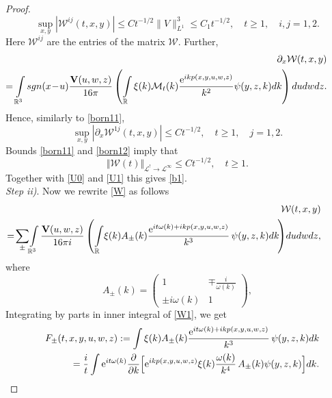 \documentclass[10pt,a4paper]{amsart}
\newcommand{\E}{\mathrm{e}}
\newcommand{\R}{{\mathbb R}}
\newcommand{\cL}{{\mathcal L}}
\newcommand{\ds}{\displaystyle}
\begin{document}
\begin{proof}
\begin{equation}\label{born11}
\sup\limits_{x,y}|{\mathcal W}^{ij}(t,x,y)|\le C t^{-1/2}\|V\|_{L^1}^3\le C_1t^{-1/2},\quad t\ge 1,\quad i,j=1,2.
\end{equation}
Here ${\mathcal W}^{ij}$ are the entries of the matrix ${\mathcal W}$. Further,
\begin{eqnarray}\nonumber
\!\!\!\!\!\!\!\!\!\!\!\! &&\!\!\!\!\!\!\!\!\partial_x{\mathcal W}(t,x,y)\\
\nonumber
\!\!\!\!\!\!\!\!\!\!\!\!&&\!\!\!\!\!\!\!\!=\int\limits_{\R^3} {\rm sgn} (x\!-\!u)\frac{{\mathbf V}(u,\rm w,z)}{16 \pi}\left(\int\limits_{\R} \xi(k)
{\mathcal M}_t(k)
\frac{\E^{ikp(x,y,u,\rm w,z)}}{k^2}\psi(y,z,k)dk\right) dud{\rm w} dz.
\end{eqnarray}
Hence, similarly to \eqref{born11},
\begin{equation}\label{born12}
\sup\limits_{x,y}|\partial_x{\mathcal W}^{1j}(t,x,y)|\le C t^{-1/2},\quad t\ge 1,\quad j=1,2.
\end{equation}
Bounds \eqref{born11} and \eqref{born12} imply that
\[%
\Vert {\mathcal W}(t)\Vert_{\cL^{!}\to \cL^\infty}\le C t^{-1/2}, \quad t\ge 1.
\]%
Together with  \eqref{U0} and \eqref{U1} this gives \eqref{b1}.
\smallskip\\
{\it Step ii)}.
Now we rewrite \eqref{W} as follows
\begin{eqnarray}\nonumber
\!\!\!\!\!\!\!\!\!\!&&\!\!\!\!\!\!\!\!\!\!\!\!\!{\mathcal W}(t,x,y)\\
\label{W1}
\!\!\!\!\!\!\!\!\!\!&&\!\!\!\!\!\!\!\!\!\!\!\!\!
= \!\sum_{\pm} \!\int\limits_{\R^3} \frac{{\mathbf V}(u,{\rm w},z)}{16 \pi i}\left(\int\limits_\R\! \xi(k)A_{\pm}(k)
\frac{\E^{it\omega(k)+ikp(x,y,u,{\rm w},z)}}{k^3}\, \psi(y,z,k)dk\!\right)\! dud{\rm w} dz,
\end{eqnarray}
where
\[
A_{\pm}(k)=\begin{pmatrix}
1  & \mp\ds\frac{i}{\omega(k)}\\
  \pm i\omega(k)& 1
\end{pmatrix},
\]
Integrating by parts in inner integral of \eqref{W1}, we get
\begin{eqnarray}\nonumber
&&F_{\pm}(t,x,y,u,{\rm w},z):=\int \xi(k)A_{\pm}(k)\frac{\E^{it\omega(k)+ikp(x,y,u,{\rm w},z)}}{k^3}\, \psi(y,z,k)dk\\
\nonumber
&&=\frac{i}{t}\int \E^{it\omega(k)}\frac{\partial}{\partial k}
\Big[\E^{ikp(x,y,u,{\rm w},z)}\xi(k)\frac{\omega(k)}{k^4}\,A_{\pm}(k) \psi(y,z,k)\Big]dk.

\end{eqnarray}
\end{proof}
\end{document}
